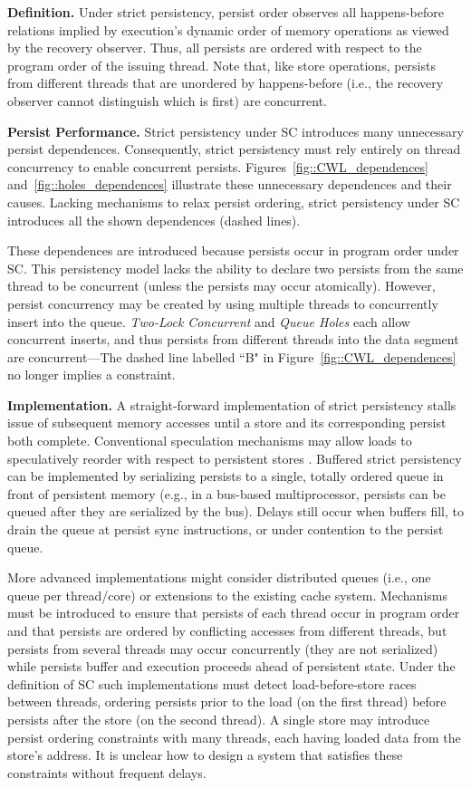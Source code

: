 \textbf{Definition.}
Under strict persistency, persist order observes all happens-before relations implied by execution's dynamic order of memory operations as viewed by the recovery observer.
Thus, all persists are ordered with respect to the program order of the issuing thread.
Note that, like store operations, persists from different threads that are unordered by happens-before (i.e., the recovery observer cannot distinguish which is first) are concurrent.

\textbf{Persist Performance.}
Strict persistency under SC introduces many unnecessary persist dependences.
Consequently, strict persistency must rely entirely on thread concurrency to enable concurrent persists.
Figures~\ref{fig::CWL_dependences} and~\ref{fig::holes_dependences} illustrate these unnecessary dependences and their causes.
Lacking mechanisms to relax persist ordering, strict persistency under SC introduces all the shown dependences (dashed lines).

These dependences are introduced because persists occur in program order under SC.
This persistency model lacks the ability to declare two persists from the same thread to be concurrent (unless the persists may occur atomically).
However, persist concurrency may be created by using multiple threads to concurrently insert into the queue.
\emph{Two-Lock Concurrent} and \emph{Queue Holes} each allow concurrent inserts, and thus persists from different threads into the data segment are concurrent---The dashed line labelled ``B" in Figure~\ref{fig::CWL_dependences} no longer implies a constraint.

\textbf{Implementation.}
A straight-forward implementation of strict persistency stalls issue of subsequent memory accesses until a store and its corresponding persist both complete.
Conventional speculation mechanisms may allow loads to speculatively reorder with respect to persistent stores \cite{Gharachorloo91}.
Buffered strict persistency can be implemented by serializing persists to a single, totally ordered queue in front of persistent memory (e.g., in a bus-based multiprocessor, persists can be queued after they are serialized by the bus).
Delays still occur when buffers fill, to drain the queue at persist sync instructions, or under contention to the persist queue.

More advanced implementations might consider distributed queues (i.e., one queue per thread/core) or extensions to the existing cache system.
Mechanisms must be introduced to ensure that persists of each thread occur in program order and that persists are ordered by conflicting accesses from different threads, but persists from several threads may occur concurrently (they are not serialized) while persists buffer and execution proceeds ahead of persistent state.
Under the definition of SC such implementations must detect load-before-store races between threads, ordering persists prior to the load (on the first thread) before persists after the store (on the second thread).
A single store may introduce persist ordering constraints with many threads, each having loaded data from the store's address.
It is unclear how to design a system that satisfies these constraints without frequent delays.

